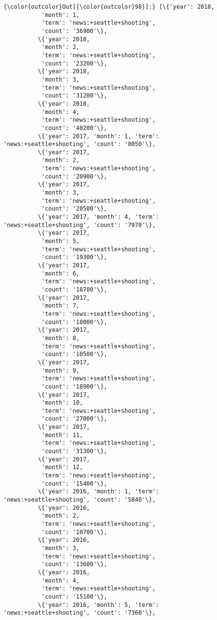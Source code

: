 \documentclass[11pt]{article}
\begin{document}
\begin{Verbatim}[commandchars=\\\{\}]
{\color{outcolor}Out[{\color{outcolor}98}]:} [\{'year': 2018,
           'month': 1,
           'term': 'news:+seattle+shooting',
           'count': '36900'\},
          \{'year': 2018,
           'month': 2,
           'term': 'news:+seattle+shooting',
           'count': '23200'\},
          \{'year': 2018,
           'month': 3,
           'term': 'news:+seattle+shooting',
           'count': '31200'\},
          \{'year': 2018,
           'month': 4,
           'term': 'news:+seattle+shooting',
           'count': '40200'\},
          \{'year': 2017, 'month': 1, 'term': 'news:+seattle+shooting', 'count': '8050'\},
          \{'year': 2017,
           'month': 2,
           'term': 'news:+seattle+shooting',
           'count': '20900'\},
          \{'year': 2017,
           'month': 3,
           'term': 'news:+seattle+shooting',
           'count': '20500'\},
          \{'year': 2017, 'month': 4, 'term': 'news:+seattle+shooting', 'count': '7970'\},
          \{'year': 2017,
           'month': 5,
           'term': 'news:+seattle+shooting',
           'count': '19300'\},
          \{'year': 2017,
           'month': 6,
           'term': 'news:+seattle+shooting',
           'count': '18700'\},
          \{'year': 2017,
           'month': 7,
           'term': 'news:+seattle+shooting',
           'count': '18000'\},
          \{'year': 2017,
           'month': 8,
           'term': 'news:+seattle+shooting',
           'count': '10500'\},
          \{'year': 2017,
           'month': 9,
           'term': 'news:+seattle+shooting',
           'count': '18900'\},
          \{'year': 2017,
           'month': 10,
           'term': 'news:+seattle+shooting',
           'count': '27000'\},
          \{'year': 2017,
           'month': 11,
           'term': 'news:+seattle+shooting',
           'count': '31300'\},
          \{'year': 2017,
           'month': 12,
           'term': 'news:+seattle+shooting',
           'count': '15400'\},
          \{'year': 2016, 'month': 1, 'term': 'news:+seattle+shooting', 'count': '5840'\},
          \{'year': 2016,
           'month': 2,
           'term': 'news:+seattle+shooting',
           'count': '10700'\},
          \{'year': 2016,
           'month': 3,
           'term': 'news:+seattle+shooting',
           'count': '13600'\},
          \{'year': 2016,
           'month': 4,
           'term': 'news:+seattle+shooting',
           'count': '15100'\},
          \{'year': 2016, 'month': 5, 'term': 'news:+seattle+shooting', 'count': '7360'\},

\end{Verbatim}
\end{document}
